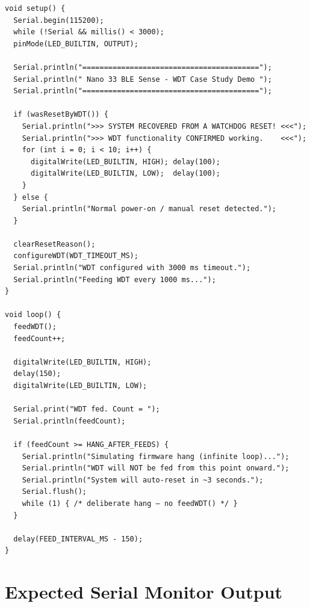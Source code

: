 \documentclass[12pt, a4paper]{article}
\begin{document}
\begin{lstlisting}[caption={\texttt{setup()} initialises the WDT and reports
  the boot reason; \texttt{loop()} feeds the WDT and simulates a hang.}]
void setup() {
  Serial.begin(115200);
  while (!Serial && millis() < 3000);
  pinMode(LED_BUILTIN, OUTPUT);

  Serial.println("=========================================");
  Serial.println(" Nano 33 BLE Sense - WDT Case Study Demo ");
  Serial.println("=========================================");

  if (wasResetByWDT()) {
    Serial.println(">>> SYSTEM RECOVERED FROM A WATCHDOG RESET! <<<");
    Serial.println(">>> WDT functionality CONFIRMED working.    <<<");
    for (int i = 0; i < 10; i++) {
      digitalWrite(LED_BUILTIN, HIGH); delay(100);
      digitalWrite(LED_BUILTIN, LOW);  delay(100);
    }
  } else {
    Serial.println("Normal power-on / manual reset detected.");
  }

  clearResetReason();
  configureWDT(WDT_TIMEOUT_MS);
  Serial.println("WDT configured with 3000 ms timeout.");
  Serial.println("Feeding WDT every 1000 ms...");
}

void loop() {
  feedWDT();
  feedCount++;

  digitalWrite(LED_BUILTIN, HIGH);
  delay(150);
  digitalWrite(LED_BUILTIN, LOW);

  Serial.print("WDT fed. Count = ");
  Serial.println(feedCount);

  if (feedCount >= HANG_AFTER_FEEDS) {
    Serial.println("Simulating firmware hang (infinite loop)...");
    Serial.println("WDT will NOT be fed from this point onward.");
    Serial.println("System will auto-reset in ~3 seconds.");
    Serial.flush();
    while (1) { /* deliberate hang — no feedWDT() */ }
  }

  delay(FEED_INTERVAL_MS - 150);
}
\end{lstlisting}

\section{Expected Serial Monitor Output}
\end{document}
